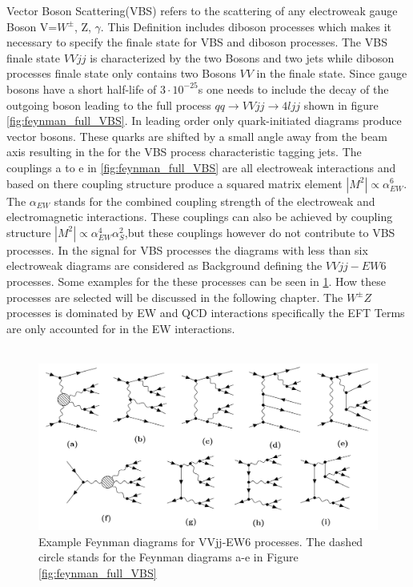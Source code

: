 \documentclass[../Bachelorarbeit.tex]{subfiles}
\begin{document}
Vector Boson Scattering(VBS) refers to the scattering of any electroweak gauge Boson V=$W^{\pm}$, Z, $\gamma$. This
Definition includes diboson processes which makes it necessary to specify the finale state for VBS and diboson processes.
The VBS finale state $VVjj$ is characterized by the two Bosons and two jets while diboson processes finale state only contains
two Bosons $VV$ in the finale state. Since gauge bosons have a short half-life of $3 \cdot 10^{-25}$s one needs to include the
decay of the outgoing boson leading to the full process $qq\rightarrow VVjj\rightarrow 4ljj$ shown in figure \ref{fig:feynman_full_VBS}.
In leading order only quark-initiated diagrams produce vector bosons. These quarks are shifted by a small angle away from
the beam axis resulting in the for the VBS process characteristic tagging jets. The couplings a to e in \ref{fig:feynman_full_VBS}
are all electroweak interactions and based on there coupling structure produce a squared matrix element
$\left\lvert M^{2} \right\rvert \propto \alpha_{EW}^{6}$. The $\alpha_{EW}$ stands for the combined coupling strength of
the electroweak and electromagnetic interactions. These couplings can also be achieved by coupling structure
$\left\lvert M^{2} \right\rvert \propto \alpha_{EW}^{4}\alpha_{S}^{2}$,but these couplings however do not contribute to VBS processes.
In the signal for VBS processes the diagrams with less than six electroweak diagrams are considered as Background defining the $VVjj-EW6$ processes.
Some examples for the these processes can be seen in \ref{fig:EW6}. How these processes are selected will be discussed in the following chapter.
The $W^{\pm}Z$ processes is dominated by EW and QCD interactions specifically the EFT Terms are only accounted for in the EW interactions.\\\\
\begin{figure}[h]
    \centering
    \includegraphics[width=\textwidth]{images/EW6.png}
    \caption{Example Feynman diagrams for VVjj-EW6 processes. The dashed circle stands for the Feynman diagrams a-e in Figure \ref*{fig:feynman_full_VBS}}
    \label{fig:EW6}
\end{figure}
\end{document}
